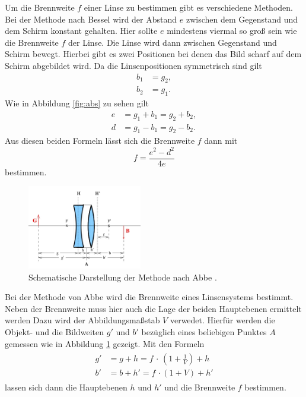 Um die Brennweite $f$ einer Linse zu bestimmen gibt es verschiedene Methoden.
Bei der Methode nach Bessel wird der Abstand $e$ zwischen dem Gegenstand und dem
Schirm konstant gehalten. Hier sollte $e$ mindestens viermal so groß sein wie die
Brennweite $f$ der Linse. Die Linse wird dann zwischen Gegenstand und Schirm
bewegt. Hierbei gibt es zwei Positionen bei denen das Bild scharf auf dem
Schirm abgebildet wird. Da die Linsenpositionen symmetrisch sind gilt
\begin{align*}
  b_1&=g_2, \\
  b_2&=g_1.
\end{align*}
Wie in Abbildung \ref{fig:abs} zu sehen gilt
\begin{align}
  e &= g_1 + b_1 = g_2 + b_2,\\
  d &= g_1 - b_1 = g_2 - b_2.
\end{align}
Aus diesen beiden Formeln lässt sich die Brennweite $f$ dann mit
\begin{equation}
  f = \frac{e^2-d^2}{4e}
\end{equation}
bestimmen.
\begin{figure}
  \includegraphics[width=5cm]{bilder/abbe.jpg}
  \caption{Schematische Darstellung der Methode nach Abbe \cite{408}.}
  \label{fig:abbe}
\end{figure}

Bei der Methode von Abbe wird die Brennweite eines Linsensystems bestimmt. Neben
der Brennweite muss hier auch die Lage der beiden Hauptebenen ermittelt werden
Dazu wird der Abbildungsmaßstab $V$ verwedet. Hierfür werden die Objekt- und die
Bildweiten  $g'$ und $b'$ bezüglich eines beliebigen Punktes $A$ gemessen wie in
Abbildung \ref{fig:abbe} gezeigt. Mit den Formeln
\begin{align}
  \begin{split}
    g' &= g + h = f\,\cdot\,\left(1+\frac{1}{V}\right) + h \\
    b' &= b + h'= f\,\cdot(1+V)+h'
    \label{eqn:haupt}
  \end{split}
\end{align}
lassen sich dann die Hauptebenen $h$ und $h'$ und die Brennweite $f$ bestimmen.
